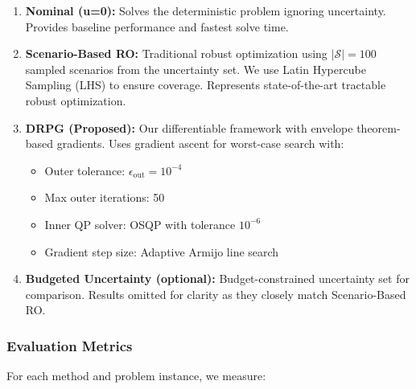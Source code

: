 \begin{enumerate}
    \item \textbf{Nominal (u=0):} Solves the deterministic problem ignoring uncertainty. Provides baseline performance and fastest solve time.

    \item \textbf{Scenario-Based RO:} Traditional robust optimization using $|\mathcal{S}| = 100$ sampled scenarios from the uncertainty set. We use Latin Hypercube Sampling (LHS) to ensure coverage. Represents state-of-the-art tractable robust optimization.

    \item \textbf{DRPG (Proposed):} Our differentiable framework with envelope theorem-based gradients. Uses gradient ascent for worst-case search with:
    \begin{itemize}
        \item Outer tolerance: $\epsilon_{\text{out}} = 10^{-4}$
        \item Max outer iterations: 50
        \item Inner QP solver: OSQP with tolerance $10^{-6}$
        \item Gradient step size: Adaptive Armijo line search
    \end{itemize}

    \item \textbf{Budgeted Uncertainty (optional):} Budget-constrained uncertainty set for comparison. Results omitted for clarity as they closely match Scenario-Based RO.
\end{enumerate}

\subsubsection{Evaluation Metrics}

For each method and problem instance, we measure:

